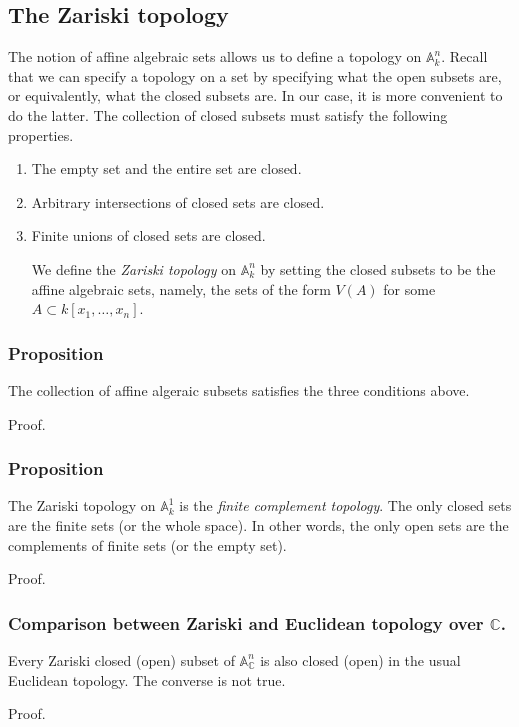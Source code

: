 \documentclass[11pt]{article}
\begin{document}
\subsection{The Zariski topology}
\label{sec:org646649e}
The notion of affine algebraic sets allows us to define a topology on \(\mathbb A^n_k\).
Recall that we can specify a topology on a set by specifying what the open subsets are, or equivalently, what the closed subsets are.
In our case, it is more convenient to do the latter.
The collection of closed subsets must satisfy the following properties.
\begin{enumerate}
\item The empty set and the entire set are closed.
\item Arbitrary intersections of closed sets are closed.
\item Finite unions of closed sets are closed.

We define the \emph{Zariski topology} on \(\mathbb A^n_k\) by setting the closed subsets to be the affine algebraic sets, namely, the sets of the form \(V(A)\) for some \(A \subset k[x_1,\dots,x_n]\).
\end{enumerate}
\subsubsection{Proposition}
\label{sec:org9f2651a}
The collection of affine algeraic subsets satisfies the three conditions above.

\begin{skipped}
Proof.
\end{skipped}

\subsubsection{Proposition}
\label{sec:orgb8458e1}
The Zariski topology on \(\mathbb A^1_k\) is the \emph{finite complement topology}.
The only closed sets are the finite sets (or the whole space).
In other words, the only open sets are the complements of finite sets (or the empty set).

\begin{skipped}
Proof.
\end{skipped}

\subsubsection{Comparison between Zariski and Euclidean topology over \(\mathbb C\).}
\label{sec:orgcd5e272}
Every Zariski closed (open) subset of \(\mathbb A^n_{\mathbb C}\) is also closed (open) in the usual Euclidean topology.
The converse is not true.
\begin{skipped}
Proof.
\end{skipped}
\end{document}
